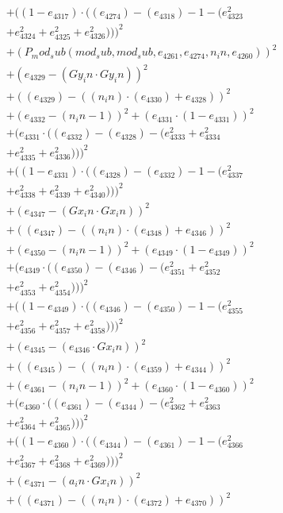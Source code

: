 \documentclass[10pt, a4paper]{article}
\begin{document}
\begin{align*}
& + ((1 - e_{4317})  \cdot  ((e_{4274}) - (e_{4318}) - 1 - (e_{4323}^{2} \\
& + e_{4324}^{2} + e_{4325}^{2} + e_{4326}^{2})))^{2} \\
& + (P_mod_sub(mod_sub, mod_sub, e_{4261}, e_{4274}, n_in, e_{4260}))^{2} \\
& + (e_{4329} - (Gy_in  \cdot  Gy_in))^{2} \\
& + ((e_{4329}) - ((n_in)  \cdot  (e_{4330}) + e_{4328}))^{2} \\
& + (e_{4332} - (n_in - 1))^{2} + (e_{4331}  \cdot  (1 - e_{4331}))^{2} \\
& + (e_{4331}  \cdot  ((e_{4332}) - (e_{4328}) - (e_{4333}^{2} + e_{4334}^{2} \\
& + e_{4335}^{2} + e_{4336}^{2})))^{2} \\
& + ((1 - e_{4331})  \cdot  ((e_{4328}) - (e_{4332}) - 1 - (e_{4337}^{2} \\
& + e_{4338}^{2} + e_{4339}^{2} + e_{4340}^{2})))^{2} \\
& + (e_{4347} - (Gx_in  \cdot  Gx_in))^{2} \\
& + ((e_{4347}) - ((n_in)  \cdot  (e_{4348}) + e_{4346}))^{2} \\
& + (e_{4350} - (n_in - 1))^{2} + (e_{4349}  \cdot  (1 - e_{4349}))^{2} \\
& + (e_{4349}  \cdot  ((e_{4350}) - (e_{4346}) - (e_{4351}^{2} + e_{4352}^{2} \\
& + e_{4353}^{2} + e_{4354}^{2})))^{2} \\
& + ((1 - e_{4349})  \cdot  ((e_{4346}) - (e_{4350}) - 1 - (e_{4355}^{2} \\
& + e_{4356}^{2} + e_{4357}^{2} + e_{4358}^{2})))^{2} \\
& + (e_{4345} - (e_{4346}  \cdot  Gx_in))^{2} \\
& + ((e_{4345}) - ((n_in)  \cdot  (e_{4359}) + e_{4344}))^{2} \\
& + (e_{4361} - (n_in - 1))^{2} + (e_{4360}  \cdot  (1 - e_{4360}))^{2} \\
& + (e_{4360}  \cdot  ((e_{4361}) - (e_{4344}) - (e_{4362}^{2} + e_{4363}^{2} \\
& + e_{4364}^{2} + e_{4365}^{2})))^{2} \\
& + ((1 - e_{4360})  \cdot  ((e_{4344}) - (e_{4361}) - 1 - (e_{4366}^{2} \\
& + e_{4367}^{2} + e_{4368}^{2} + e_{4369}^{2})))^{2} \\
& + (e_{4371} - (a_in  \cdot  Gx_in))^{2} \\
& + ((e_{4371}) - ((n_in)  \cdot  (e_{4372}) + e_{4370}))^{2} \\

\end{align*}
\end{document}
